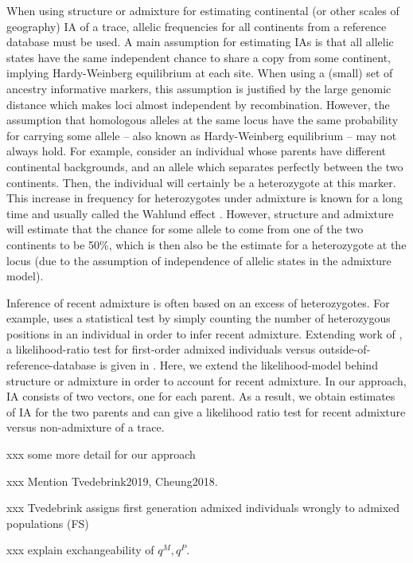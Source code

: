 \documentclass[12pt]{article}
\theoremstyle{definition}
\begin{document}
When using {\sc structure} or {\sc admixture} for estimating
continental (or other scales of geography) IA of a trace, allelic
frequencies for all continents from a reference database must be
used. A main assumption for estimating IAs is that all allelic states
have the same independent chance to share a copy from some continent,
implying Hardy-Weinberg equilibrium at each site. When using a (small)
set of ancestry informative markers, this assumption is justified by
the large genomic distance which makes loci almost independent by
recombination. However, the assumption that homologous alleles at the
same locus have the same probability for carrying some allele -- also
known as Hardy-Weinberg equilibrium -- may not always hold. For
example, consider an individual whose parents have different
continental backgrounds, and an allele which separates perfectly
between the two continents. Then, the individual will certainly be a
heterozygote at this marker.  This increase in frequency for
heterozygotes under admixture is known for a long time and usually
called the Wahlund effect \cite{Wahlund1928}.  However, {\sc
  structure} and {\sc admixture} will estimate that the chance for
some allele to come from one of the two continents to be 50\%, which
is then also be the estimate for a heterozygote at the locus (due to
the assumption of independence of allelic states in the admixture
model).

Inference of recent admixture is often based on an excess of
heterozygotes. For example, \cite{McNevin2019} uses a statistical test
by simply counting the number of heterozygous positions in an
individual in order to infer recent admixture. Extending work of
\cite{Tvedebrink2018a}, a likelihood-ratio test for first-order admixed
individuals versus outside-of-reference-database is given in
\cite{Tvedebrink2019}. Here, we extend the likelihood-model behind
{\sc structure} or {\sc admixture} in order to account for recent
admixture. In our approach, IA consists of two vectors, one for each
parent. As a result, we obtain estimates of IA for the two parents and
can give a likelihood ratio test for recent admixture versus
non-admixture of a trace.

xxx some more detail for our approach

xxx Mention Tvedebrink2019, Cheung2018.

xxx Tvedebrink assigns first generation admixed individuals wrongly to admixed populations (FS)

xxx explain exchangeability of $q^M, q^P$.
\end{document}

